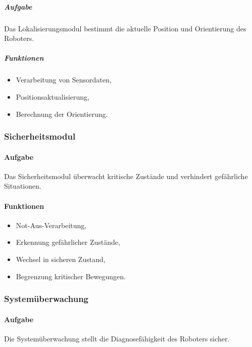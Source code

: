 \subparagraph{Aufgabe}\label{aufgabe-8}

Das Lokalisierungsmodul bestimmt die aktuelle Position und Orientierung
des Roboters.

\subparagraph{Funktionen}\label{funktionen-2}

\begin{itemize}
\tightlist
\item
  Verarbeitung von Sensordaten,
\item
  Positionsaktualisierung,
\item
  Berechnung der Orientierung.
\end{itemize}

\subsubsection{Sicherheitsmodul}\label{sicherheitsmodul}

\paragraph{Aufgabe}\label{aufgabe-9}

Das Sicherheitsmodul überwacht kritische Zustände und verhindert
gefährliche Situationen.

\paragraph{Funktionen}\label{funktionen-3}

\begin{itemize}
\tightlist
\item
  Not-Aus-Verarbeitung,
\item
  Erkennung gefährlicher Zustände,
\item
  Wechsel in sicheren Zustand,
\item
  Begrenzung kritischer Bewegungen.
\end{itemize}

\subsubsection{Systemüberwachung}\label{systemuxfcberwachung-2}

\paragraph{Aufgabe}\label{aufgabe-10}

Die Systemüberwachung stellt die Diagnosefähigkeit des Roboters sicher.

